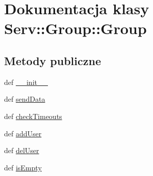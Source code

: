 \hypertarget{class_serv_1_1_group_1_1_group}{
\section{Dokumentacja klasy Serv::Group::Group}
\label{class_serv_1_1_group_1_1_group}
}
\subsection*{Metody publiczne}
\begin{CompactItemize}
\item 
def \hyperlink{class_serv_1_1_group_1_1_group_ee5bd24c2c39d9c06c11aec410690c3d}{\_\-\_\-init\_\-\_\-}
\item 
def \hyperlink{class_serv_1_1_group_1_1_group_cbb0137781676208d4de16b90d8d9cc0}{sendData}
\item 
def \hyperlink{class_serv_1_1_group_1_1_group_ff52dadf0f67e54340f9602cc3a6fbba}{checkTimeouts}
\item 
def \hyperlink{class_serv_1_1_group_1_1_group_0a4183d2362794bd55741a35e4b5a91d}{addUser}
\item 
def \hyperlink{class_serv_1_1_group_1_1_group_48768b6b5440e56d42d632085b2a8aef}{delUser}
\item 
def \hyperlink{class_serv_1_1_group_1_1_group_51e7ce8393ee398260d4e12e904da5ab}{isEmpty}
\end{CompactItemize}
